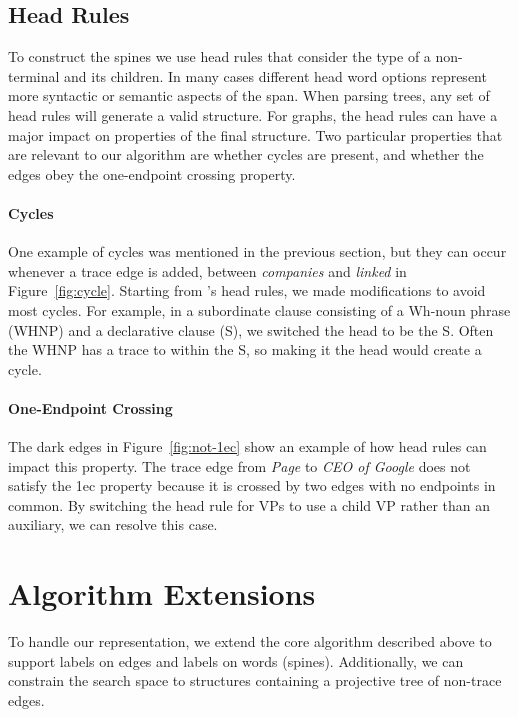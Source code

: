 \subsection{Head Rules} \label{sec:rep-head}

To construct the spines we use head rules that consider the type of a non-terminal and its children.
In many cases different head word options represent more syntactic or semantic aspects of the span.
When parsing trees, any set of head rules will generate a valid structure.
For graphs, the head rules can have a major impact on properties of the final structure.
Two particular properties that are relevant to our algorithm are whether cycles are present, and whether the edges obey the one-endpoint crossing property.

\paragraph{Cycles}
One example of cycles was mentioned in the previous section, but they can occur whenever a trace edge is added, \myeg between \emph{companies} and \emph{linked} in Figure~\ref{fig:cycle}.
Starting from \textcite{cck}'s head rules, we made modifications to avoid most cycles.
For example, in a subordinate clause consisting of a Wh-noun phrase (WHNP) and a declarative clause (S), we switched the head to be the S.
Often the WHNP has a trace to within the S, so making it the head would create a cycle.

\paragraph{One-Endpoint Crossing}
The dark edges in Figure~\ref{fig:not-1ec} show an example of how head rules can impact this property.
The trace edge from \emph{Page} to \emph{CEO of Google} does not satisfy the 1ec property because it is crossed by two edges with no endpoints in common.
By switching the head rule for VPs to use a child VP rather than an auxiliary, we can resolve this case.

\section{Algorithm Extensions}
To handle our representation, we extend the core algorithm described above to support labels on edges and labels on words (spines).
Additionally, we can constrain the search space to structures containing a projective tree of non-trace edges.

